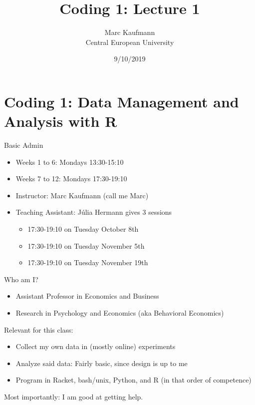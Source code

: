 \documentclass[
  ignorenonframetext,
]{beamer}
\title{Coding 1: Lecture 1}
\author{Marc Kaufmann\\
Central European University}
\date{9/10/2019}
\providecommand{\tightlist}{%
  \setlength{\itemsep}{0pt}\setlength{\parskip}{0pt}}
\begin{document}
\frame{\titlepage}

\hypertarget{coding-1-data-management-and-analysis-with-r}{%
\section{Coding 1: Data Management and Analysis with
R}\label{coding-1-data-management-and-analysis-with-r}}

\begin{frame}{Basic Admin}
\protect\hypertarget{basic-admin}{}

\begin{itemize}
\tightlist
\item
  Weeks 1 to 6: Mondays 13:30-15:10
\item
  Weeks 7 to 12: Mondays 17:30-19:10
\item
  Instructor: Marc Kaufmann (call me Marc)
\item
  Teaching Assistant: Júlia Hermann gives 3 sessions

  \begin{itemize}
  \tightlist
  \item
    17:30-19:10 on Tuesday October 8th
  \item
    17:30-19:10 on Tuesday November 5th
  \item
    17:30-19:10 on Tuesday November 19th
  \end{itemize}
\end{itemize}

\end{frame}

\begin{frame}{Who am I?}
\protect\hypertarget{who-am-i}{}

\pause{}

\begin{itemize}
\tightlist
\item
  Assistant Professor in Economics and Business
\item
  Research in Psychology and Economics (aka Behavioral Economics)
\end{itemize}

\pause{}

Relevant for this class:

\begin{itemize}
\tightlist
\item
  Collect my own data in (mostly online) experiments
\item
  Analyze said data: Fairly basic, since design is up to me
\item
  Program in Racket, bash/unix, Python, and R (in that order of
  competence)
\end{itemize}

\pause{}

Most importantly: I am good at getting help.

\end{frame}
\end{document}
